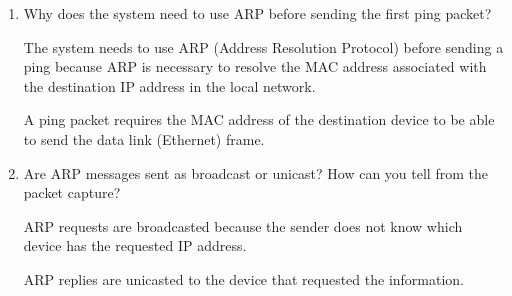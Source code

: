 \documentclass[a4paper]{article}
\begin{document}
\begin{enumerate}
\begin{itemize}
					IPv4 (0x0800), indicating that this ARP request/reply is related to IPv4.
					
				\item Hardware size:
				
					6, which is the size of the MAC address (6 bytes).
					
				\item Protocol size:
				
					4, which is the size of the IP address (4 bytes).
					
				\item Opcode:
				
					1 for ARP request and 2 for ARP reply. The ARP request asks "Who has this IP?" while the ARP reply answers with the MAC address.
					
				\item Sender MAC address:
					
					The MAC address of the device sending the ARP message.
					
				\item Sender IP address:
				
					The IP address of the device sending the ARP message.
					
				\item Target MAC address:
					
					The MAC address of the device being queried.
					
				\item Target IP address:
				
					The IP address of the device being queried.
			
			\end{itemize}
			
			\item Why does the system need to use ARP before sending the first ping packet?
			
			The system needs to use ARP (Address Resolution Protocol) before sending a ping because ARP is necessary to resolve the MAC address associated with the destination IP address in the local network.
			
			A ping packet requires the MAC address of the destination device to be able to send the data link (Ethernet) frame.
			
			\item Are ARP messages sent as broadcast or unicast? How can you tell from the packet capture?
			
			ARP requests are broadcasted because the sender does not know which device has the requested IP address.
			
			ARP replies are unicasted to the device that requested the information.
			
		\end{enumerate}
		
\end{document}
